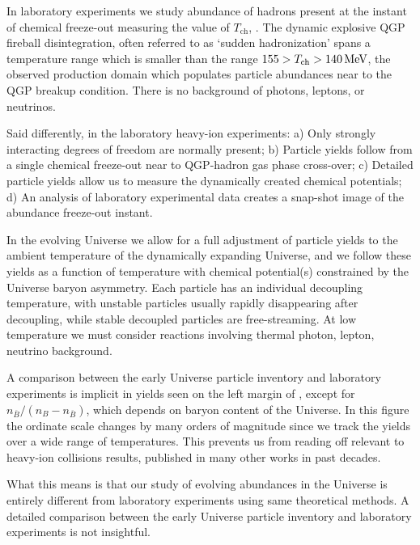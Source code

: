 {\color{black}
In laboratory experiments we study abundance of hadrons present at the instant of chemical freeze-out measuring the value of $T_\mathrm{ch}$, . The dynamic explosive QGP fireball disintegration, often referred to as `sudden hadronization' spans a temperature range which is smaller than the range $155>T_\mathrm{ch}>140\text{\,MeV}$, the observed production domain which populates particle abundances near to the QGP breakup condition. There is no background of photons, leptons, or neutrinos. 

Said differently, in the laboratory heavy-ion experiments: a) Only strongly interacting degrees of freedom are normally present; b) Particle yields follow from a single chemical freeze-out near to QGP-hadron gas phase cross-over; c) Detailed particle yields allow us to measure the dynamically created chemical potentials; d) An analysis of laboratory experimental data creates a snap-shot image of the abundance freeze-out instant.

In the evolving Universe  we allow for a full adjustment of particle yields to the ambient temperature of the dynamically expanding Universe, and we follow these yields as a function of temperature with chemical potential(s) constrained by the Universe baryon asymmetry. Each particle
has an individual decoupling temperature, with unstable particles usually rapidly disappearing after decoupling, while stable decoupled particles are free-streaming. At low temperature we must consider reactions involving thermal photon, lepton, neutrino background.

A comparison between the early Universe particle inventory and laboratory experiments is implicit in yields seen on the left margin of , except for $n_{\overline{B}}/(n_B-n_{\overline{B}})$, which depends on baryon content of the Universe. In this figure the ordinate scale changes by many orders of magnitude since we track the yields over a wide range of temperatures. This prevents us from reading off relevant to heavy-ion collisions results, published in many  other works in past decades.

What this means is that our study of evolving abundances in the Universe is entirely different from laboratory experiments  using same theoretical methods. A detailed comparison between the early Universe particle inventory and laboratory experiments is not insightful.
}